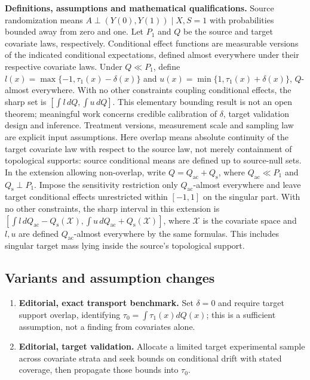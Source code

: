 \documentclass[11pt,a4paper]{article}
\begin{document}
\textbf{Definitions, assumptions and mathematical qualifications.} Source randomization means \(A\perp(Y(0),Y(1))\mid X,S=1\) with probabilities bounded away from zero and one. Let \(P_1\) and \(Q\) be the source and target covariate laws, respectively. Conditional effect functions are measurable versions of the indicated conditional expectations, defined almost everywhere under their respective covariate laws. Under \(Q\ll P_1\), define \(l(x)=\max\{-1,\tau_1(x)-\delta(x)\}\) and \(u(x)=\min\{1,\tau_1(x)+\delta(x)\}\), \(Q\)-almost everywhere. With no other constraints coupling conditional effects, the sharp set is \([\int l\,dQ,\int u\,dQ]\). This elementary bounding result is not an open theorem; meaningful work concerns credible calibration of \(\delta\), target validation design and inference. Treatment versions, measurement scale and sampling law are explicit input assumptions. Here overlap means absolute continuity of the target covariate law with respect to the source law, not merely containment of topological supports: source conditional means are defined up to source-null sets. In the extension allowing non-overlap, write \(Q=Q_{\mathrm{ac}}+Q_{\mathrm{s}}\), where \(Q_{\mathrm{ac}}\ll P_1\) and \(Q_{\mathrm{s}}\perp P_1\). Impose the sensitivity restriction only \(Q_{\mathrm{ac}}\)-almost everywhere and leave target conditional effects unrestricted within \([-1,1]\) on the singular part. With no other constraints, the sharp interval in this extension is \([\int l\,dQ_{\mathrm{ac}}-Q_{\mathrm{s}}(\mathcal X),\int u\,dQ_{\mathrm{ac}}+Q_{\mathrm{s}}(\mathcal X)]\), where \(\mathcal X\) is the covariate space and \(l,u\) are defined \(Q_{\mathrm{ac}}\)-almost everywhere by the same formulas. This includes singular target mass lying inside the source's topological support.
\subsection*{Variants and assumption changes}
\begin{enumerate}
\item \textbf{Editorial, exact transport benchmark.} Set \(\delta=0\) and require target support overlap, identifying \(\tau_0=\int\tau_1(x)dQ(x)\); this is a sufficient assumption, not a finding from covariates alone.
\item \textbf{Editorial, target validation.} Allocate a limited target experimental sample across covariate strata and seek bounds on conditional drift with stated coverage, then propagate those bounds into \(\tau_0\).
\end{enumerate}
\end{document}
